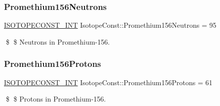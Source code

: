 \subsubsection{\texorpdfstring{Promethium156\+Neutrons}{Promethium156Neutrons}}
{\footnotesize\ttfamily \mbox{\hyperlink{group___isotope_const-_macros_ga5f18360b3e99483a35c32d789e62621c}{I\+S\+O\+T\+O\+P\+E\+C\+O\+N\+S\+T\+\_\+\+I\+NT}} Isotope\+Const\+::\+Promethium156\+Neutrons = 95}

\$ \$ Neutrons in Promethium-\/156. \mbox{\label{group___isotope_const-_promethium-_pm156_ga792013a35dd186316efbf08928e38bc4}} 
\subsubsection{\texorpdfstring{Promethium156\+Protons}{Promethium156Protons}}
{\footnotesize\ttfamily \mbox{\hyperlink{group___isotope_const-_macros_ga5f18360b3e99483a35c32d789e62621c}{I\+S\+O\+T\+O\+P\+E\+C\+O\+N\+S\+T\+\_\+\+I\+NT}} Isotope\+Const\+::\+Promethium156\+Protons = 61}

\$ \$ Protons in Promethium-\/156. 